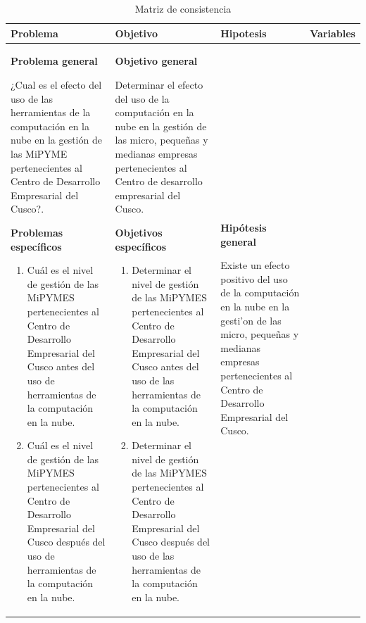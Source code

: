 \begin{table}
\centering
\caption{Matriz de consistencia}
\label{t:consistencia}
\begin{tabular}{|p{5cm}|p{5cm}|p{5cm}|p{4cm}|}
\hline
Problema & Objetivo & Hipotesis & Variables \\ \hline
\textbf{Problema general}

¿Cual es el efecto del uso de las herramientas de la computación en la nube
en la gestión de las MiPYME pertenecientes al Centro de Desarrollo Empresarial
del Cusco?.

\textbf{Problemas específicos}

\begin{enumerate}[noitemsep]
\item Cuál es el nivel de gestión de las MiPYMES pertenecientes al Centro
de Desarrollo Empresarial del Cusco antes del uso de herramientas de la computación
en la nube.
\item Cuál es el nivel de gestión de las MiPYMES pertenecientes al Centro
de Desarrollo Empresarial del Cusco después del uso de herramientas de la computación
en la nube.
\end{enumerate}
&
\textbf{Objetivo general}

Determinar el efecto del uso de la computación en la nube en la gestión de
las micro, pequeñas y medianas empresas pertenecientes al Centro de desarrollo
empresarial del Cusco.

\textbf{Objetivos específicos}
\begin{enumerate}
  \item Determinar el nivel de gestión de las MiPYMES pertenecientes al Centro de
  Desarrollo Empresarial del Cusco antes del uso de las herramientas de la
  computación en la nube.
  \item Determinar el nivel de gestión de las MiPYMES pertenecientes al Centro de
  Desarrollo Empresarial del Cusco después del uso de las herramientas de la
  computación en la nube.
\end{enumerate}
&
\textbf{Hipótesis general}

Existe un efecto positivo del uso de la computación en la nube en la
gesti'on de las micro, pequeñas y medianas empresas pertenecientes al Centro de
Desarrollo Empresarial del Cusco.


\end{tabular}
\end{table}
